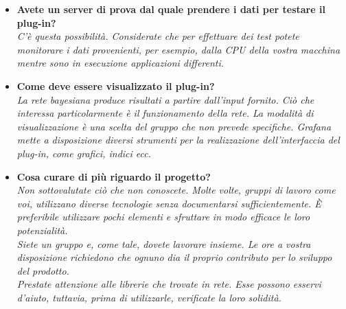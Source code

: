 \begin{itemize}
\item\textbf{Avete un server di prova dal quale prendere i dati per testare il plug-in?}\\
\emph{C'è questa possibilità. Considerate che per effettuare dei test potete monitorare i dati provenienti, per esempio, dalla CPU della vostra macchina mentre sono in esecuzione applicazioni differenti.}

\item\textbf{Come deve essere visualizzato il plug-in?}\\
\emph{La rete bayesiana produce risultati a partire dall'input fornito. Ciò che interessa particolarmente è il funzionamento della rete. La modalità di visualizzazione è una scelta del gruppo che non prevede specifiche. Grafana mette a disposizione diversi strumenti per la realizzazione dell'interfaccia del plug-in, come grafici, indici ecc.}

\item\textbf{Cosa curare di più riguardo il progetto?}\\
\emph{Non sottovalutate ciò che non conoscete. Molte volte, gruppi di lavoro come voi, utilizzano diverse tecnologie senza documentarsi sufficientemente. È preferibile utilizzare pochi elementi e sfruttare in modo efficace le loro potenzialità. \\
Siete un gruppo e, come tale, dovete lavorare insieme. Le ore a vostra disposizione richiedono che ognuno dia il proprio contributo per lo sviluppo del prodotto.\\
Prestate attenzione alle librerie che trovate in rete. Esse possono esservi d'aiuto, tuttavia, prima di utilizzarle, verificate la loro solidità.}
\end{itemize}
